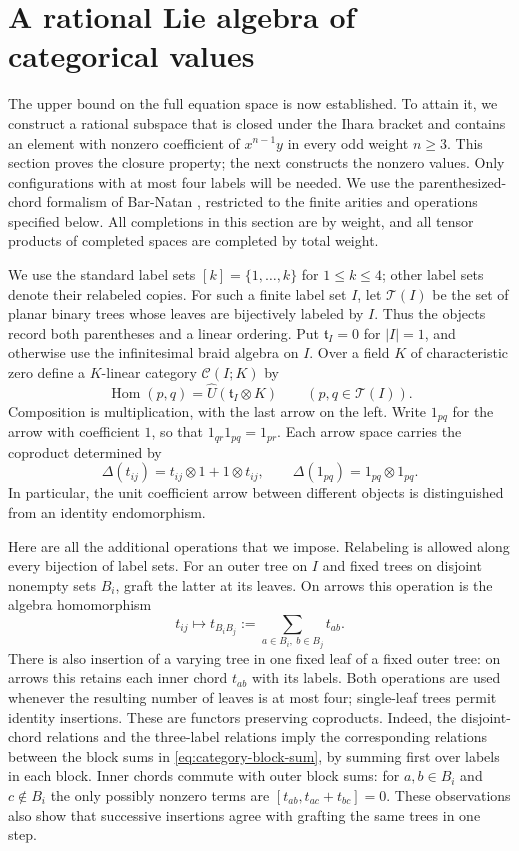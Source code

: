 \section{A rational Lie algebra of categorical values}\label{sec:category}

The upper bound on the full equation space is now established.  To
attain it, we construct a rational subspace that is closed under the
Ihara bracket and contains an element with nonzero coefficient of
$x^{n-1}y$ in every odd weight $n\geq3$.  This section proves the
closure property; the next constructs the nonzero values.
Only configurations with at most four labels will be needed.
We use the parenthesized-chord formalism of Bar-Natan
\cite[Sections~2--3]{BarNatan}, restricted to the finite arities and
operations specified below.
All completions in this section are by weight, and all tensor products of
completed spaces are completed by total weight.

We use the standard label sets $[k]=\{1,\ldots,k\}$ for
$1\leq k\leq4$; other label sets denote their relabeled copies.
For such a finite label set $I$, let
$\mathcal T(I)$ be the set of planar binary trees whose leaves are
bijectively labeled by $I$.  Thus the objects record both parentheses and
a linear ordering.  Put $\mathfrak t_I=0$ for $|I|=1$, and otherwise use
the infinitesimal braid algebra on $I$.  Over a field $K$ of
characteristic zero define a $K$-linear category $\mathcal C(I;K)$ by
\[
 \operatorname{Hom}(p,q)=\widehat U(\mathfrak t_I\otimes K)
 \qquad(p,q\in\mathcal T(I)).
\]
Composition is multiplication, with the last arrow on the left.  Write
$1_{pq}$ for the arrow with coefficient $1$, so that
$1_{qr}1_{pq}=1_{pr}$.  Each arrow space carries the coproduct determined
by
\[
 \Delta(t_{ij})=t_{ij}\otimes1+1\otimes t_{ij},
 \qquad \Delta(1_{pq})=1_{pq}\otimes1_{pq}.
\]
In particular, the unit coefficient arrow between different objects is
distinguished from an identity endomorphism.

Here are all the additional operations that we impose.  Relabeling is
allowed along every bijection of label sets.  For an outer tree on $I$
and fixed trees on disjoint nonempty sets $B_i$, graft the latter at its
leaves.  On arrows this operation is the algebra homomorphism
\begin{equation}\label{eq:category-block-sum}
 t_{ij}\longmapsto t_{B_iB_j}:=
 \sum_{a\in B_i,\ b\in B_j}t_{ab}.
\end{equation}
There is also insertion of a varying tree in one fixed leaf of a fixed
outer tree: on arrows this retains each inner chord $t_{ab}$ with its
labels.  Both operations are used whenever the resulting number of
leaves is at most four; single-leaf trees permit identity insertions.
These are functors preserving coproducts.  Indeed, the disjoint-chord
relations and the three-label relations imply the corresponding
relations between the block sums in
\eqref{eq:category-block-sum}, by summing first over labels in each
block.  Inner chords commute with outer block sums: for
$a,b\in B_i$ and $c\notin B_i$ the only possibly nonzero terms are
$[t_{ab},t_{ac}+t_{bc}]=0$.  These observations also show that successive
insertions agree with grafting the same trees in one step.

